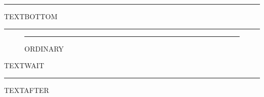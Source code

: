 \documentclass[a4paper]{memoir}
\begin{document}
\begin{table}[b]
  \centering
  \caption{BOTTOMTABLE, on the page of its text.}
  \rule{4cm}{1cm}
\end{table}
TEXTBOTTOM \lipsum[1][1-3]
\begin{marginfigure}
  \rule{2cm}{1cm}
  \caption{MARGINBOTTOM}
\end{marginfigure}
\lipsum[1][4-6]

\begin{figure}[p]
  \centering
  \rule{4cm}{4cm}
  \caption{ORDINARY}
\end{figure}
TEXTWAIT \lipsum[2][1-3]
\begin{marginfigure}
  \rule{2cm}{1cm}
  \caption{MARGINAFTER}
\end{marginfigure}
TEXTAFTER \lipsum[3][1-3]
\end{document}

